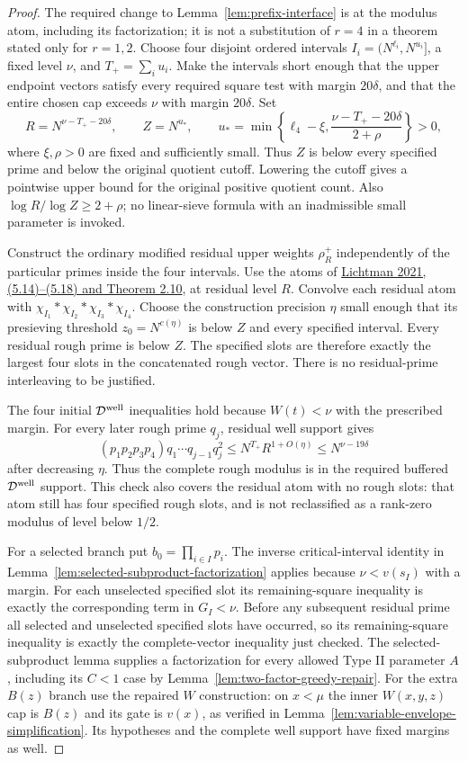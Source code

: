 \documentclass[11pt]{article}
\begin{document}
\begin{proof}
The required change to Lemma~\ref{lem:prefix-interface} is at the
modulus atom, including its factorization; it is not a substitution
of $r=4$ in a theorem stated only for $r=1,2$.
Choose four disjoint ordered intervals
$I_i=(N^{\ell_i},N^{u_i}]$, a fixed level $\nu$, and
$T_+=\sum_i u_i$.  Make the intervals short enough that the upper
endpoint vectors satisfy every required square test with margin
$20\delta$, and that the entire chosen cap exceeds $\nu$ with
margin $20\delta$.  Set
\[
 R=N^{\nu-T_+-20\delta},\qquad
 Z=N^{u_*},\qquad
 u_* =\min\left\{\ell_4-\xi,
                 \frac{\nu-T_+-20\delta}{2+\rho}\right\}>0,
\]
where $\xi,\rho>0$ are fixed and sufficiently small.  Thus $Z$ is
below every specified prime and below the original quotient cutoff.
Lowering the cutoff gives a pointwise upper bound for the original
positive quotient count.  Also $\log R/\log Z\ge2+\rho$; no
linear-sieve formula with an inadmissible small parameter is invoked.

Construct the ordinary modified residual upper weights $\rho_R^+$
independently of the particular primes inside the four intervals.
Use the atoms of
\href{https://arxiv.org/html/2109.02851v2}{Lichtman 2021,
(5.14)--(5.18) and Theorem 2.10}, at residual level $R$.
Convolve each residual atom with
$\chi_{I_1}*\chi_{I_2}*\chi_{I_3}*\chi_{I_4}$.
Choose the construction precision $\eta$ small enough that its
presieving threshold $z_0=N^{c(\eta)}$ is below $Z$ and every
specified interval.  Every residual rough prime is below $Z$.
The specified slots are therefore exactly the largest four slots
in the concatenated rough vector.  There is no residual-prime
interleaving to be justified.

The four initial $\mathcal D^{\rm well}$ inequalities hold because
$W(t)<\nu$ with the prescribed margin.  For every later rough prime
$q_j$, residual well support gives
\[
 (p_1p_2p_3p_4)q_1\cdots q_{j-1}q_j^2
 \le N^{T_+}R^{1+O(\eta)}\le N^{\nu-19\delta}
\]
after decreasing $\eta$.  Thus the complete rough modulus is in
the required buffered $\mathcal D^{\rm well}$ support.  This check
also covers the residual atom with no rough slots: that atom still
has four specified rough slots, and is not reclassified as a
rank-zero modulus of level below $1/2$.

For a selected branch put $b_0=\prod_{i\in I}p_i$.
The inverse critical-interval identity in
Lemma~\ref{lem:selected-subproduct-factorization} applies because
$\nu<v(s_I)$ with a margin.  For each unselected specified slot its
remaining-square inequality is exactly the corresponding term in
$G_I<\nu$.  Before any subsequent residual prime all selected and
unselected specified slots have occurred, so its remaining-square
inequality is exactly the complete-vector inequality just checked.
The selected-subproduct lemma supplies a factorization for every
allowed Type II parameter $A$, including its $C<1$ case by
Lemma~\ref{lem:two-factor-greedy-repair}.  For the extra $B(z)$
branch use the repaired $W$ construction: on $x<\mu$ the inner
$W(x,y,z)$ cap is $B(z)$ and its gate is $v(x)$, as verified in
Lemma~\ref{lem:variable-envelope-simplification}.  Its hypotheses
and the complete well support have fixed margins as well.


\end{proof}
\end{document}
